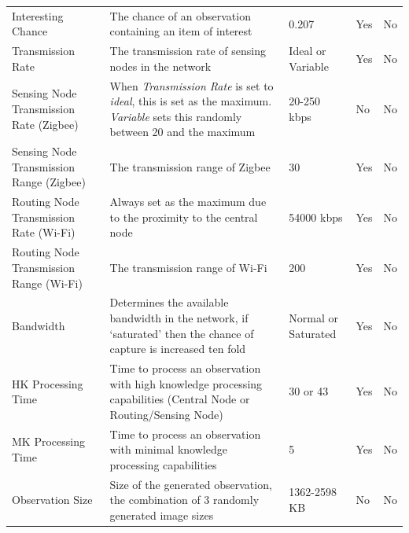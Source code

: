 \begin{landscape}
\begin{table}
\begin{tabularx}{\textwidth}{|p{4cm}|p{10cm}|p{3cm}|p{2cm}|p{2cm}|}
	Interesting Chance                      & The chance of an observation containing an item of interest                                                                 & 0.207               & Yes                & No                 \\
	Transmission Rate                       & The transmission rate of sensing nodes in the network                                                                       & Ideal or Variable   & Yes                & No                 \\
	Sensing Node Transmission Rate (Zigbee) & When \textit{Transmission Rate} is set to \textit{ideal}, this is set as the maximum. \textit{Variable} sets this randomly between 20 and the maximum & 20-250 kbps         & No                 & No                 \\
	Sensing Node Transmission Range (Zigbee)& The transmission range of Zigbee                                                                                            & 30                  & Yes                & No                 \\
	Routing Node Transmission Rate (Wi-Fi)  & Always set as the maximum due to the proximity to the central node                                                          & 54000 kbps          & Yes                & No                 \\
	Routing Node Transmission Range (Wi-Fi) & The transmission range of Wi-Fi                                                                                             & 200                 & Yes                & No                 \\
	Bandwidth                               & Determines the available bandwidth in the network, if `saturated' then the chance of capture is increased ten fold          & Normal or Saturated & Yes                & No                 \\
	HK Processing Time                      & Time to process an observation with high knowledge processing capabilities (Central Node or Routing/Sensing Node)           & 30 or 43            & Yes                & No                 \\
	MK Processing Time                      & Time to process an observation with minimal knowledge processing capabilities                                               & 5                   & Yes                & No                 \\
	Observation Size                        & Size of the generated observation, the combination of 3 randomly generated image sizes                                      & 1362-2598 KB        & No                 & No                 \\

\end{tabularx}
\end{table}
\end{landscape}
